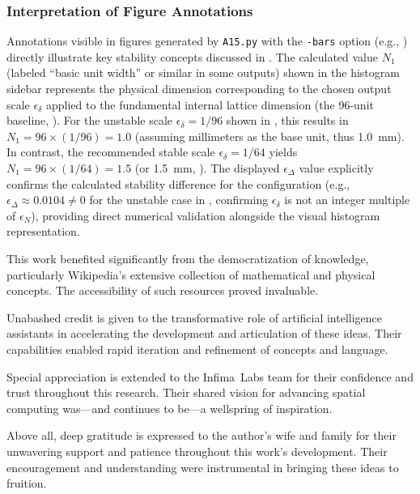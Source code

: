 \documentclass[10pt]{article}
\def\IL{Infima~Labs}
\begin{document}
\subsubsection{Interpretation of Figure Annotations}\label{subsubsec-notes-figures}
Annotations visible in figures generated by \texttt{A15.py} with the \texttt{-bars} option (e.g., ) directly illustrate key stability concepts discussed in . The calculated value $N_1$ (labeled ``basic unit width'' or similar in some outputs) shown in the histogram sidebar represents the physical dimension corresponding to the chosen output scale $\epsilon_\delta$ applied to the fundamental internal lattice dimension (the 96-unit baseline, ). For the unstable scale $\epsilon_\delta=1/96$ shown in , this results in $N_1 = 96 \times (1/96) = 1.0$ (assuming millimeters as the base unit, thus \SI{1.0}{\milli\meter}). In contrast, the recommended stable scale $\epsilon_\delta = 1/64$ yields $N_1 = 96 \times (1/64) = 1.5$ (or \SI{1.5}{\milli\meter}, ). The displayed $\epsilon_\Delta$ value explicitly confirms the calculated stability difference for the configuration (e.g., $\epsilon_\Delta \approx \num{0.0104} \neq 0$ for the unstable case in , confirming $\epsilon_\delta$ is not an integer multiple of $\epsilon_N$), providing direct numerical validation alongside the visual histogram representation.


\begin{acknowledgements}
    This work benefited significantly from the democratization of knowledge, particularly Wikipedia's extensive collection of mathematical and physical concepts. The accessibility of such resources proved invaluable.

    Unabashed credit is given to the transformative role of artificial intelligence assistants in accelerating the development and articulation of these ideas. Their capabilities enabled rapid iteration and refinement of concepts and language.

    Special appreciation is extended to the \IL{} team for their confidence and trust throughout this research. Their shared vision for advancing spatial computing was---and continues to be---a wellspring of inspiration.

    Above all, deep gratitude is expressed to the author's wife and family for their unwavering support and patience throughout this work's development. Their encouragement and understanding were instrumental in bringing these ideas to fruition.
\end{acknowledgements}




\end{document}
